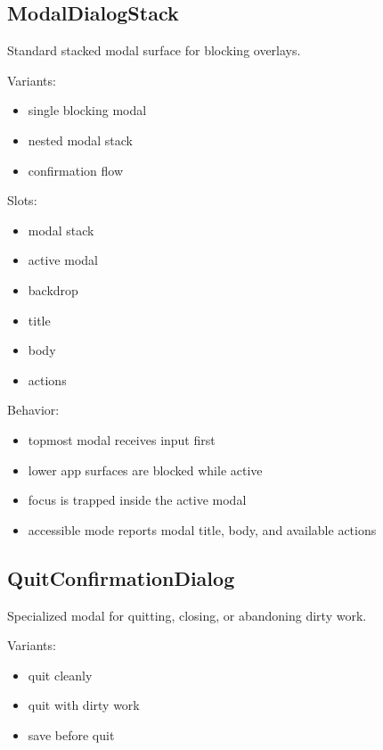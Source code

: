 \subsection{ModalDialogStack}\label{record-128-modaldialogstack}

Standard stacked modal surface for blocking overlays.

Variants:

\begin{itemize}
\tightlist
\item
  single blocking modal
\item
  nested modal stack
\item
  confirmation flow
\end{itemize}

Slots:

\begin{itemize}
\tightlist
\item
  modal stack
\item
  active modal
\item
  backdrop
\item
  title
\item
  body
\item
  actions
\end{itemize}

Behavior:

\begin{itemize}
\tightlist
\item
  topmost modal receives input first
\item
  lower app surfaces are blocked while active
\item
  focus is trapped inside the active modal
\item
  accessible mode reports modal title, body, and available actions
\end{itemize}

\subsection{QuitConfirmationDialog}\label{record-128-quitconfirmationdialog}

Specialized modal for quitting, closing, or abandoning dirty work.

Variants:

\begin{itemize}
\tightlist
\item
  quit cleanly
\item
  quit with dirty work
\item
  save before quit
\end{itemize}

